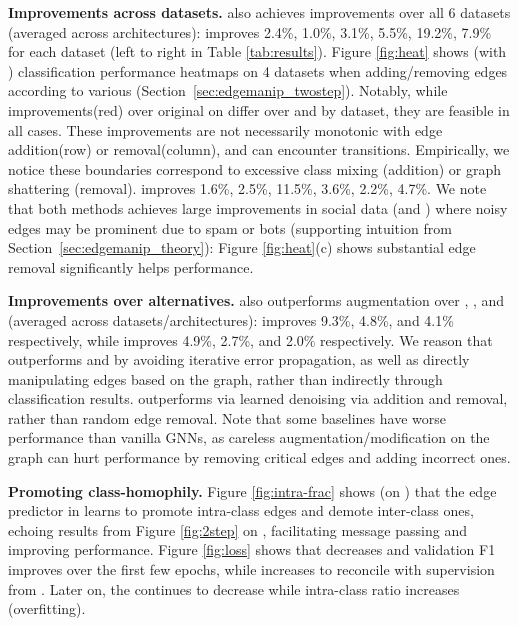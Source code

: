 \documentclass[letterpaper]{article} \usepackage{aaai21}  \usepackage{times}  \usepackage{helvet} \usepackage{courier}  \usepackage[hyphens]{url}  \usepackage{graphicx} \urlstyle{rm} \def\UrlFont{\rm}  \usepackage{natbib}  \usepackage{caption} \frenchspacing  \setlength{\pdfpagewidth}{8.5in}  \setlength{\pdfpageheight}{11in}
\begin{document}
\noindent \textbf{Improvements across datasets.} \methodshared also achieves improvements over all 6 datasets (averaged across architectures): \methodtwo improves 2.4\%, 1.0\%, 3.1\%, 5.5\%, 19.2\%, 7.9\% for each dataset (left to right in Table \ref{tab:results}).  Figure \ref{fig:heat} shows \methodtwo (with \gcn) classification performance heatmaps on 4 datasets when adding/removing edges according to various  (Section~\ref{sec:edgemanip_twostep}).  Notably, while improvements(red) over original \gcn on  differ over  and by dataset, they are feasible in all cases. These improvements are not necessarily monotonic with edge addition(row) or removal(column), and can encounter transitions.  Empirically, we notice these boundaries correspond to excessive class mixing (addition) or graph shattering (removal).  \method improves 1.6\%, 2.5\%, 11.5\%, 3.6\%, 2.2\%, 4.7\%.  We note that both methods achieves large improvements in social data (\blogc and \flickr) where noisy edges may be prominent due to spam or bots (supporting intuition from Section~\ref{sec:edgemanip_theory}): Figure \ref{fig:heat}(c) shows substantial edge removal significantly helps performance.


\noindent \textbf{Improvements over alternatives.} \methodshared also outperforms augmentation over \bgcn, \adaedge, and \dropedge (averaged across datasets/architectures): \methodtwo improves 9.3\%, 4.8\%, and 4.1\% respectively, while \method improves 4.9\%, 2.7\%, and 2.0\% respectively. We reason that \methodtwo outperforms \bgcn and \adaedge by avoiding iterative error propagation, as well as directly manipulating edges based on the graph, rather than indirectly through classification results. \method outperforms \dropedge via learned denoising via addition and removal, rather than random edge removal. Note that some baselines have worse performance than vanilla GNNs, as careless augmentation/modification on the graph can hurt performance by removing critical edges and adding incorrect ones. 

\noindent \textbf{Promoting class-homophily.} Figure \ref{fig:intra-frac} shows (on \cora) that the edge predictor in \method learns to promote intra-class edges and demote inter-class ones, echoing results from Figure \ref{fig:2step} on \methodtwo, facilitating message passing and improving performance.  Figure \ref{fig:loss} shows that  decreases and validation F1 improves over the first few epochs, while  increases to reconcile with supervision from .  Later on, the  continues to decrease while intra-class ratio increases (overfitting).
\end{document}
